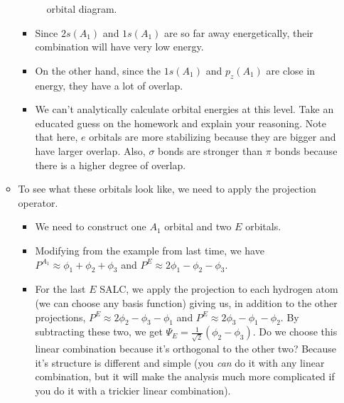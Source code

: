 \documentclass[../notes.tex]{subfiles}
\begin{document}
\begin{itemize}
\begin{itemize}
\begin{figure}[H]
            \caption{ orbital diagram.}
            \label{fig:orbitalDiagram-NH3}
        \end{figure}
        \begin{itemize}
            \item Since $2s(A_1)$ and $1s(A_1)$ are so far away energetically, their combination will have very low energy.
            \item On the other hand, since the $1s(A_1)$ and $p_z(A_1)$ are close in energy, they have a lot of overlap.
            \item We can't analytically calculate orbital energies at this level. Take an educated guess on the homework and explain your reasoning. Note that here, $e$ orbitals are more stabilizing because they are bigger and have larger overlap. Also, $\sigma$ bonds are stronger than $\pi$ bonds because there is a higher degree of overlap.
        \end{itemize}
        \item To see what these orbitals look like, we need to apply the projection operator.
        \begin{itemize}
            \item We need to construct one $A_1$ orbital and two $E$ orbitals.
            \item Modifying from the example from last time, we have $P^{A_1}\approx\phi_1+\phi_2+\phi_3$ and $P^E\approx 2\phi_1-\phi_2-\phi_3$.
            \item For the last $E$ SALC, we apply the projection to each hydrogen atom (we can choose any basis function) giving us, in addition to the other projections, $P^E\approx 2\phi_2-\phi_3-\phi_1$ and $P^E\approx 2\phi_3-\phi_1-\phi_2$. By subtracting these two, we get $\Psi_E=\frac{1}{\sqrt{2}}(\phi_2-\phi_3)$. Do we choose this linear combination because it's orthogonal to the other two? Because it's structure is different and simple (you \emph{can} do it with any linear combination, but it will make the analysis much more complicated if you do it with a trickier linear combination).

\end{itemize}
\end{itemize}
\end{itemize}
\end{document}
